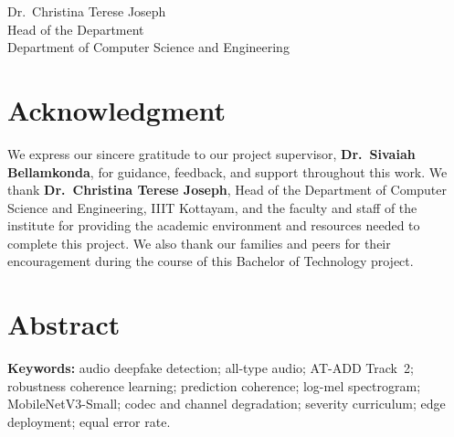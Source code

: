 \documentclass[12pt,a4paper]{report}
\newcommand{\SupervisorName}{Dr.\ Sivaiah Bellamkonda}
\newcommand{\DepartmentName}{Computer Science and Engineering}
\newcommand{\HoDName}{Dr.\ Christina Terese Joseph}
\begin{document}
\vspace{1.8cm}
\noindent\hfill
\begin{minipage}{0.7\textwidth}
\raggedleft
\HoDName\\
Head of the Department\\
Department of \DepartmentName
\end{minipage}

\clearpage
\chapter*{Acknowledgment}
\noindent
We express our sincere gratitude to our project supervisor, \textbf{\SupervisorName}, for guidance, feedback, and support throughout this work. We thank \textbf{\HoDName}, Head of the Department of \DepartmentName, IIIT Kottayam, and the faculty and staff of the institute for providing the academic environment and resources needed to complete this project. We also thank our families and peers for their encouragement during the course of this Bachelor of Technology project.

\clearpage
\chapter*{Abstract}
\begingroup
\setlength{\parskip}{0.4cm}
\noindent
\endgroup

\vspace{0.3cm}
\noindent\textbf{Keywords:} audio deepfake detection; all-type audio; AT-ADD Track~2; robustness coherence learning; prediction coherence; log-mel spectrogram; MobileNetV3-Small; codec and channel degradation; severity curriculum; edge deployment; equal error rate.

\clearpage
\tableofcontents
\clearpage
\listoffigures
\clearpage
\listoftables
\clearpage


\clearpage
{}
\pagestyle{fancy}







\appendix


\printbibliography[title={References}, heading=bibintoc]
\end{document}
